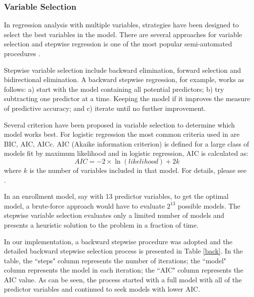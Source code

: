 \documentclass[12pt,english]{report}
\begin{document}
\subsubsection{Variable Selection}
In regression analysis with multiple variables, strategies have been designed to select the best variables in the model. There are several approaches for variable selection and stepwise regression is one of the most popular semi-automated procedures \citep{han2011data}. 

Stepwise variable selection include backward elimination, forward selection and bidirectional elimination. A backward stepwise regression, for example, works as follows: a) start with the model containing all potential predictors; b) try subtracting one predictor at a time. Keeping the model if it improves the measure of predictive accuracy; and c) iterate until no further improvement.

Several criterion have been proposed in variable selection to determine which model works best. For logistic regression the most common criteria used in  are BIC, AIC, AICc.  AIC (Akaike information criterion) is defined for a large class of models fit by maximum likelihood and in logistic regression, AIC is calculated as:
\begin{equation}
	AIC= -2 \times \ln(likelihood) + 2k
\end{equation}
where $k$ is the number of variables included in that model. For details, please see  \citep{han2011data}. 
	
In an enrollment model, say with 13 predictor variables, to get the optimal model, a brute-force approach would have to evaluate $2^{13}$ possible models.  The stepwise variable selection evaluates only a limited number of models and presents a heuristic solution to the problem in a fraction of time.  

In our implementation, a backward stepwise procedure was adopted and the detailed backward stepwise selection process is presented in Table \ref{back}. In the table, the ``steps" column represents the number of iterations; the ``model" column represents the model in each iteration; the ``AIC" column represents the AIC value.  As can be seen, the process started with a full model with all of the predictor variables and continued to seek models with lower AIC.
\end{document}
